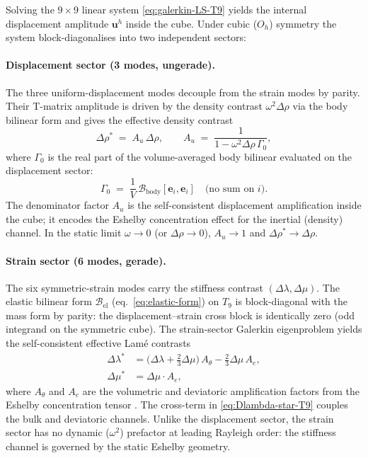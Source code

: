 \documentclass[11pt,a4paper]{article}
\newcommand{\D}{\Delta}
\newcommand{\bu}{\bm{u}}
\theoremstyle{plain}
\theoremstyle{definition}
\theoremstyle{remark}
\begin{document}
Solving the $9\times9$ linear system \eqref{eq:galerkin-LS-T9} yields
the internal displacement amplitude $\bu^h$ inside the cube.  Under cubic
($O_h$) symmetry the system block-diagonalises into two independent sectors:

\paragraph{Displacement sector (3 modes, ungerade).}
The three uniform-displacement modes decouple from the strain modes by
parity.  Their T-matrix amplitude is driven by the density contrast
$\omega^2\D\rho$ via the body bilinear form and gives the effective
density contrast
\begin{equation}
  \D\rho^{*}
  \;=\; A_u\,\D\rho, \qquad
  A_u \;=\; \frac{1}{1 - \omega^2\D\rho\,\Gamma_0},
  \label{eq:Arho}
\end{equation}
where $\Gamma_0$ is the real part of the volume-averaged body bilinear
evaluated on the displacement sector:
\begin{equation}
  \Gamma_0 \;=\; \frac{1}{V}\,\mathcal{B}_{\mathrm{body}}[\mathbf{e}_i, \mathbf{e}_i]
  \quad\text{(no sum on }i\text{)}.
  \label{eq:Gamma0}
\end{equation}
The denominator factor $A_u$ is the self-consistent displacement
amplification inside the cube; it encodes the Eshelby concentration
effect \cite{eshelby1957} for the inertial (density) channel.  In the
static limit $\omega\to 0$ (or $\D\rho\to 0$), $A_u\to 1$ and
$\D\rho^{*} \to \D\rho$.

\paragraph{Strain sector (6 modes, gerade).}
The six symmetric-strain modes carry the stiffness contrast
$(\D\lambda, \D\mu)$.  The elastic bilinear form
$\mathcal{B}_{\mathrm{el}}$ (eq.~\eqref{eq:elastic-form}) on
$T_9$ is block-diagonal with the mass form by parity: the
displacement--strain cross block is identically zero (odd integrand on the
symmetric cube).  The strain-sector Galerkin eigenproblem yields the
self-consistent effective Lam\'e contrasts
\begin{align}
  \D\lambda^* &= \bigl(\D\lambda + \tfrac{2}{3}\D\mu\bigr)\,A_\theta
    - \tfrac{2}{3}\D\mu\,A_e,
    \label{eq:Dlambda-star-T9}\\
  \D\mu^* &= \D\mu\cdot A_e,
  \label{eq:Dmu-star-T9}
\end{align}
where $A_\theta$ and $A_e$ are the volumetric and deviatoric amplification
factors from the Eshelby concentration tensor \cite{eshelby1957,mura1987}.
The cross-term in \eqref{eq:Dlambda-star-T9} couples the bulk and
deviatoric channels.  Unlike the displacement sector, the strain sector
has no dynamic ($\omega^2$) prefactor at leading Rayleigh order: the
stiffness channel is governed by the static Eshelby geometry.
\end{document}
